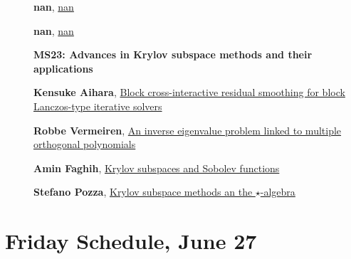 \documentclass[ILAS2025-program.tex]{subfiles}
\begin{document}
\begin{description}
\begin{description}
        \item[] \hypertarget{up0389}{}\textbf{nan}, \hyperlink{down0389}{nan}
        \item[] \hypertarget{up0390}{}\textbf{nan}, \hyperlink{down0390}{nan}
        \end{description}
    \begin{description}
    \item[] {\color{mstitle}\textbf{MS23: Advances in Krylov subspace methods and their applications}} 
    \item[] \hypertarget{up0391}{}\textbf{Kensuke Aihara}, \hyperlink{down0391}{Block cross-interactive residual smoothing for block Lanczos-type iterative solvers}
        \item[] \hypertarget{up0392}{}\textbf{Robbe Vermeiren}, \hyperlink{down0392}{An inverse eigenvalue problem linked to multiple orthogonal polynomials
}
        \item[] \hypertarget{up0393}{}\textbf{Amin Faghih}, \hyperlink{down0393}{Krylov subspaces and Sobolev functions}
        \item[] \hypertarget{up0394}{}\textbf{Stefano Pozza}, \hyperlink{down0394}{Krylov subspace methods an the $\star$-algebra}
        \end{description}
    \end{description}
    \newpage

\section{Friday Schedule, June 27}
    
\end{document}
